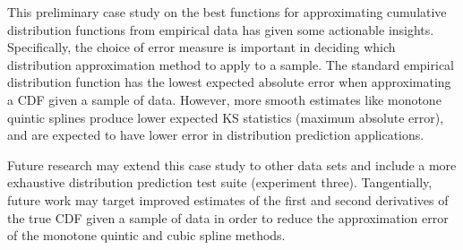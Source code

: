 \documentclass[letterpaper, 10 pt, conference]{IEEEtran}  %
\begin{document}
This preliminary case study on the best functions for approximating cumulative distribution functions from empirical data has given some actionable insights. Specifically, the choice of error measure is important in deciding which distribution approximation method to apply to a sample. The standard empirical distribution function has the lowest expected absolute error when approximating a CDF given a sample of data. However, more smooth estimates like monotone quintic splines produce lower expected KS statistics (maximum absolute error), and are expected to have lower error in distribution prediction applications.

Future research may extend this case study to other data sets and include a more exhaustive distribution prediction test suite (experiment three). Tangentially, future work may target improved estimates of the first and second derivatives of the true CDF given a sample of data in order to reduce the approximation error of the monotone quintic and cubic spline methods.

\balance








\end{document}
